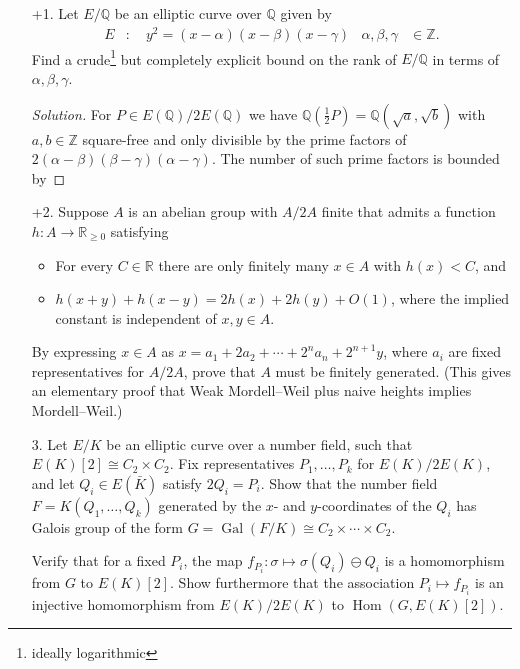 \documentclass[a4paper]{article}
\theoremstyle{plain}
\theoremstyle{remark}
\theoremstyle{definition}
\DeclareMathOperator{\Hom}{Hom}
\DeclareMathOperator{\Gal}{Gal}
\newcommand{\Z}{\mathbb{Z}}
\newcommand{\Q}{\mathbb{Q}}
\newcommand{\R}{\mathbb{R}}
\begin{document}
\begin{enumerate}
    \item[+1.] Let $E/\Q$ be an elliptic curve over $\Q$ given by
        \begin{align*}
            E&:\quad y^2=(x-\alpha)(x-\beta)(x-\gamma) &
            \alpha,\beta,\gamma&\in\Z.
        \end{align*}
        Find a crude\footnote{ideally logarithmic} but completely explicit bound
        on the rank of $E/\Q$ in terms of $\alpha,\beta,\gamma$.

        \begin{proof}[Solution]
            For $P\in E(\Q)/2E(\Q)$ we have
            $\Q(\frac{1}{2}P)=\Q(\sqrt a,\sqrt b)$ with $a,b\in\Z$ square-free
            and only divisible by the prime factors of
            $2(\alpha-\beta)(\beta-\gamma)(\alpha-\gamma)$. The number of such
            prime factors is bounded by
        \end{proof}

    \item[+2.] Suppose $A$ is an abelian group with $A/2A$ finite that admits a
        function $h:A\to\R_{\ge0}$ satisfying
        \begin{itemize}
            \item For every $C\in\R$ there are only finitely many $x\in A$ with
                $h(x)<C$, and
            \item $h(x+y)+h(x-y)=2h(x)+2h(y)+O(1)$, where the implied constant
                is independent of $x,y\in A$.
        \end{itemize}
        By expressing $x\in A$ as $x=a_1+2a_2+\cdots+2^na_n+2^{n+1}y$, where
        $a_i$ are fixed representatives for $A/2A$, prove that $A$ must be
        finitely generated. (This gives an elementary proof that Weak
        Mordell--Weil plus naive heights implies Mordell--Weil.)

    \item[3.] Let $E/K$ be an elliptic curve over a number field, such that
        $E(K)[2]\cong C_2\times C_2$. Fix representatives $P_1,\ldots,P_k$ for
        $E(K)/2E(K)$, and let $Q_i\in E(\bar K)$ satisfy $2Q_i=P_i$. Show that
        the number field $F=K(Q_1,\ldots,Q_k)$ generated by the $x$- and
        $y$-coordinates of the $Q_i$ has Galois group of the form
        $G=\Gal(F/K)\cong C_2\times\cdots\times C_2$.

        Verify that for a fixed $P_i$, the map
        $f_{P_i}:\sigma\mapsto\sigma(Q_i)\ominus Q_i$ is a homomorphism from $G$
        to $E(K)[2]$. Show furthermore that the association $P_i\mapsto f_{P_i}$
        is an injective homomorphism from $E(K)/2E(K)$ to $\Hom(G,E(K)[2])$.


\end{enumerate}
\end{document}
